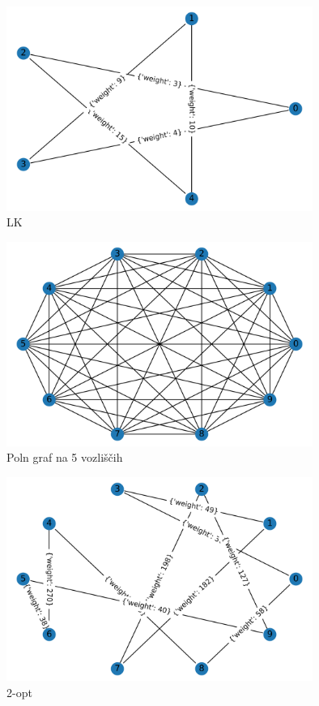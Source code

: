 \documentclass[8pt]{beamer}
\begin{document}
\begin{frame}
\begin{figure}
  \includegraphics[width=10cm]{primeri/primer1_lk.png}
\caption{LK}
\label{Slika 4}
\end{figure}
\end{frame}

\begin{frame}
  \begin{figure}
  \includegraphics[width=10cm]{primeri/primer2.png}
 	\caption{Poln graf na 5 vozliščih}
	\label{Slika 5}
	\end{figure}
\end{frame}

\begin{frame}
\begin{figure}
  \includegraphics[width=10cm]{primeri/primer2_2opt.png}
\caption{2-opt}
\label{Slika 6}
\end{figure}
\end{frame}
\end{document}
